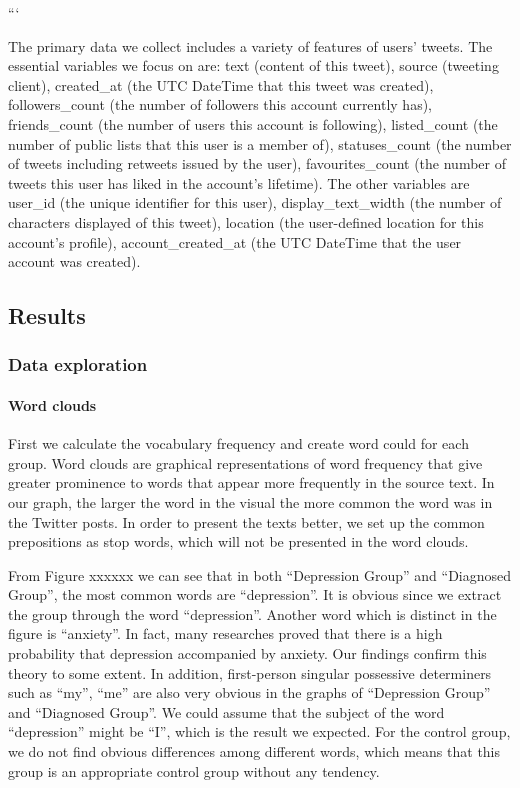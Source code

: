 \documentclass[]{article}
\let\oldparagraph\paragraph
\renewcommand{\paragraph}[1]{\oldparagraph{#1}\mbox{}}
\begin{document}
```

The primary data we collect includes a variety of features of users'
tweets. The essential variables we focus on are: text (content of this
tweet), source (tweeting client), created\_at (the UTC DateTime that
this tweet was created), followers\_count (the number of followers this
account currently has), friends\_count (the number of users this account
is following), listed\_count (the number of public lists that this user
is a member of), statuses\_count (the number of tweets including
retweets issued by the user), favourites\_count (the number of tweets
this user has liked in the account's lifetime). The other variables are
user\_id (the unique identifier for this user), display\_text\_width
(the number of characters displayed of this tweet), location (the
user-defined location for this account's profile), account\_created\_at
(the UTC DateTime that the user account was created).

\hypertarget{results}{%
\subsection{Results}\label{results}}

\hypertarget{data-exploration}{%
\subsubsection{Data exploration}\label{data-exploration}}

\hypertarget{word-clouds}{%
\paragraph{Word clouds}\label{word-clouds}}

First we calculate the vocabulary frequency and create word could for
each group. Word clouds are graphical representations of word frequency
that give greater prominence to words that appear more frequently in the
source text. In our graph, the larger the word in the visual the more
common the word was in the Twitter posts. In order to present the texts
better, we set up the common prepositions as stop words, which will not
be presented in the word clouds.

From Figure xxxxxx we can see that in both ``Depression Group'' and
``Diagnosed Group'', the most common words are ``depression''. It is
obvious since we extract the group through the word ``depression''.
Another word which is distinct in the figure is ``anxiety''. In fact,
many researches proved that there is a high probability that depression
accompanied by anxiety. Our findings confirm this theory to some extent.
In addition, first-person singular possessive determiners such as
``my'', ``me'' are also very obvious in the graphs of ``Depression
Group'' and ``Diagnosed Group''. We could assume that the subject of the
word ``depression'' might be ``I'', which is the result we expected. For
the control group, we do not find obvious differences among different
words, which means that this group is an appropriate control group
without any tendency.
\end{document}
